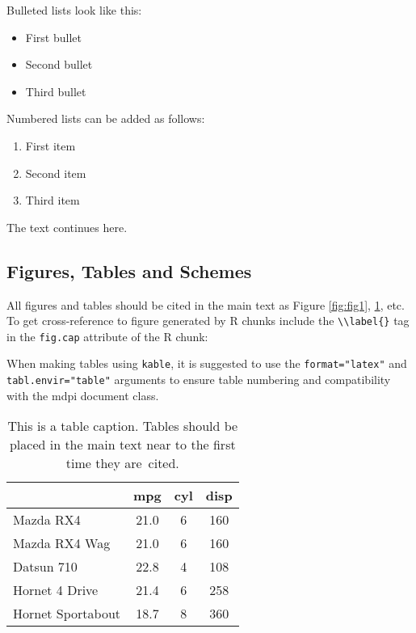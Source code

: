 \documentclass[atmosphere,article,submit,moreauthors,pdftex]{Definitions/mdpi}
\providecommand{\tightlist}{%
  \setlength{\itemsep}{0pt}\setlength{\parskip}{0pt}}
\begin{document}
Bulleted lists look like this:

\begin{itemize}
\tightlist
\item
  First bullet
\item
  Second bullet
\item
  Third bullet
\end{itemize}

Numbered lists can be added as follows:

\begin{enumerate}
\def\labelenumi{\arabic{enumi}.}
\tightlist
\item
  First item
\item
  Second item
\item
  Third item
\end{enumerate}

The text continues here.

\subsection{Figures, Tables and
Schemes}\label{figures-tables-and-schemes}

All figures and tables should be cited in the main text as Figure
\ref{fig:fig1}, \ref{tab:tab1}, etc. To get cross-reference to figure
generated by R chunks include the
\texttt{\textbackslash{}\textbackslash{}label\{\}} tag in the
\texttt{fig.cap} attribute of the R chunk:

When making tables using \texttt{kable}, it is suggested to use the
\texttt{format="latex"} and \texttt{tabl.envir="table"} arguments to
ensure table numbering and compatibility with the mdpi document class.

\begin{table}[H]

\caption{\label{tab:tab1}This is a table caption. Tables should be placed in the 
             main text near to the first time they are~cited.}
\begin{tabular}[t]{lccc}
\toprule
  & mpg & cyl & disp\\
\midrule
Mazda RX4 & 21.0 & 6 & 160\\
Mazda RX4 Wag & 21.0 & 6 & 160\\
Datsun 710 & 22.8 & 4 & 108\\
Hornet 4 Drive & 21.4 & 6 & 258\\
Hornet Sportabout & 18.7 & 8 & 360\\
\bottomrule
\end{tabular}
\end{table}
\end{document}
